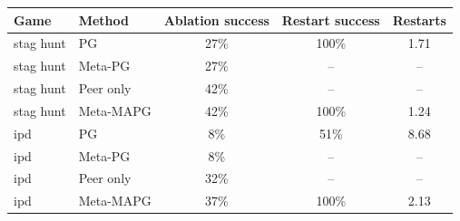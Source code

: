 \begin{tabular}{llccc}\toprule
Game & Method & Ablation success & Restart success & Restarts \\\midrule
stag hunt & PG & 27\% & 100\% & 1.71 \\
stag hunt & Meta-PG & 27\% & -- & -- \\
stag hunt & Peer only & 42\% & -- & -- \\
stag hunt & Meta-MAPG & 42\% & 100\% & 1.24 \\
ipd & PG & 8\% & 51\% & 8.68 \\
ipd & Meta-PG & 8\% & -- & -- \\
ipd & Peer only & 32\% & -- & -- \\
ipd & Meta-MAPG & 37\% & 100\% & 2.13 \\
\bottomrule
\end{tabular}
